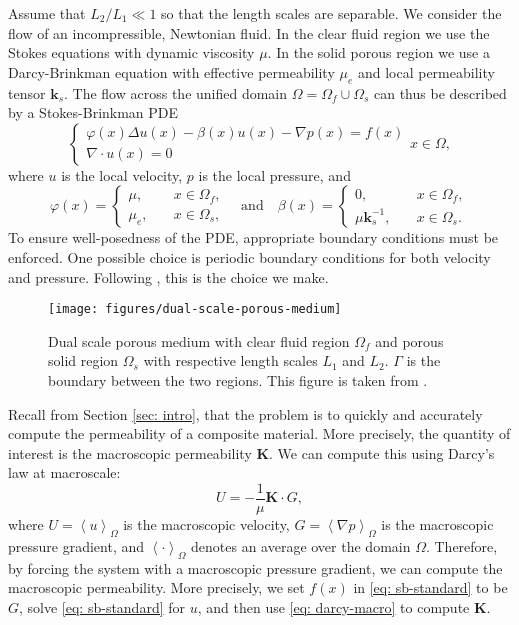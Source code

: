 \documentclass[12pt]{article}
\newcommand\abrack[1]{\left \langle #1 \right \rangle}
\theoremstyle{theorem}
\begin{document}
Assume that $L_2/L_1 \ll 1$ so that the length scales are separable. We consider the flow of an incompressible, Newtonian fluid. In the clear fluid region we use the Stokes equations with dynamic viscosity $\mu$. In the solid porous region we use a Darcy-Brinkman equation \cite{brinkman1949} with effective permeability $\mu_e$ and local permeability tensor $\mathbf{k}_s$. The flow across the unified domain $\Omega = \Omega_f \cup \Omega_s$ can thus be described by a Stokes-Brinkman PDE
\begin{equation}\label{eq: sb-standard}
    \begin{cases}
        \varphi(x)\Delta u(x) - \beta(x)u(x) - \nabla p(x) = f(x) \\
        \nabla \cdot u(x) = 0
    \end{cases} x \in \Omega,
\end{equation}
where $u$ is the local velocity, $p$ is the local pressure, and
\begin{equation}
    \varphi(x) = 
    \begin{cases}
        \mu, \quad &x \in \Omega_f, \\
        \mu_e, \quad &x \in \Omega_s,
    \end{cases}
    \quad
    \text{and}
    \quad
    \beta(x) = 
    \begin{cases}
        0, \quad &x \in \Omega_f, \\
        \mu \mathbf{k}_s^{-1}, \quad &x \in \Omega_s.
    \end{cases}
\end{equation}
To ensure well-posedness of the PDE, appropriate boundary conditions must be enforced. One possible choice is periodic boundary conditions for both velocity and pressure. Following \cite{chen2023}, this is the choice we make.

\begin{figure}[h!]
    \centering
    \texttt{[image: figures/dual-scale-porous-medium]}
    \caption{Dual scale porous medium with clear fluid region $\Omega_f$ and porous solid region $\Omega_s$ with respective length scales $L_1$ and $L_2$. $\Gamma$ is the boundary between the two regions. This figure is taken from \cite{chen2023}.}
    \label{fig: dual-scale-porous-medium}
\end{figure}

Recall from Section \ref{sec: intro}, that the problem is to quickly and accurately compute the permeability of a composite material. More precisely, the quantity of interest is the macroscopic permeability $\mathbf{K}$. We can compute this using Darcy's law at macroscale:
\begin{equation}\label{eq: darcy-macro}
U = - \frac{1}{\mu}\mathbf{K} \cdot G,
\end{equation}
where $U = \abrack{u}_\Omega$ is the macroscopic velocity, $G = \abrack{\nabla p}_\Omega$ is the macroscopic pressure gradient, and $\abrack{\cdot}_\Omega$ denotes an average over the domain $\Omega$. Therefore, by forcing the system with a macroscopic pressure gradient, we can compute the macroscopic permeability. More precisely, we set $f(x)$ in \eqref{eq: sb-standard} to be $G$, solve \eqref{eq: sb-standard} for $u$, and then use \eqref{eq: darcy-macro} to compute $\mathbf{K}$.
\end{document}
